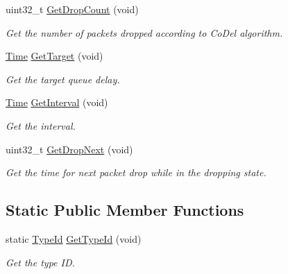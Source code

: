 \begin{DoxyCompactItemize}
uint32\+\_\+t \hyperlink{classns3_1_1CoDelQueueDisc_a8af7efb44124c9fd4699de0d71c5a58d}{Get\+Drop\+Count} (void)
\begin{DoxyCompactList}\small\item\em Get the number of packets dropped according to Co\+Del algorithm. \end{DoxyCompactList}\item 
\hyperlink{classns3_1_1Time}{Time} \hyperlink{classns3_1_1CoDelQueueDisc_aacbaf8a85b6a82b9175db11bac44e55f}{Get\+Target} (void)
\begin{DoxyCompactList}\small\item\em Get the target queue delay. \end{DoxyCompactList}\item 
\hyperlink{classns3_1_1Time}{Time} \hyperlink{classns3_1_1CoDelQueueDisc_a8527687c2e67d2b90adb63fb5b9ce204}{Get\+Interval} (void)
\begin{DoxyCompactList}\small\item\em Get the interval. \end{DoxyCompactList}\item 
uint32\+\_\+t \hyperlink{classns3_1_1CoDelQueueDisc_a0fb737d0730a5977b84f6f0d10bb28e3}{Get\+Drop\+Next} (void)
\begin{DoxyCompactList}\small\item\em Get the time for next packet drop while in the dropping state. \end{DoxyCompactList}\end{DoxyCompactItemize}
\subsection*{Static Public Member Functions}
\begin{DoxyCompactItemize}
\item 
static \hyperlink{classns3_1_1TypeId}{Type\+Id} \hyperlink{classns3_1_1CoDelQueueDisc_ae0ee4bf739d0a32330de43741a362f59}{Get\+Type\+Id} (void)
\begin{DoxyCompactList}\small\item\em Get the type ID. \end{DoxyCompactList}\end{DoxyCompactItemize}
